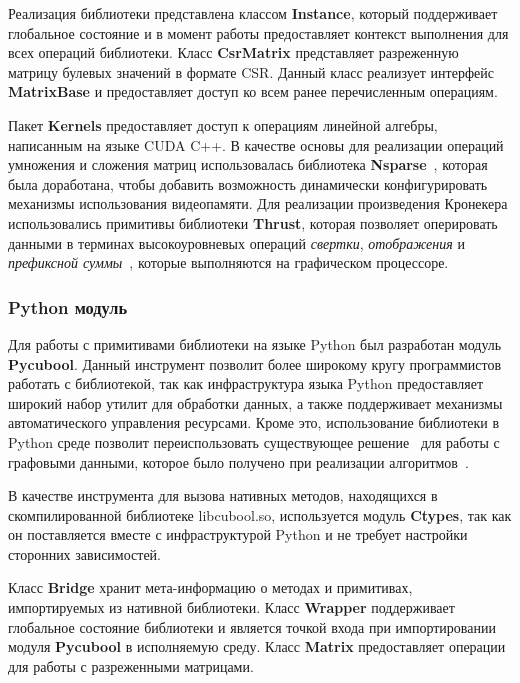 Реализация библиотеки представлена классом \textbf{Instance}, который поддерживает глобальное состояние и в момент работы предоставляет контекст выполнения для всех операций библиотеки. Класс \textbf{CsrMatrix} представляет разреженную матрицу булевых значений в формате CSR. Данный класс реализует интерфейс \textbf{MatrixBase} и предоставляет доступ ко всем ранее перечисленным операциям.

Пакет \textbf{Kernels} предоставляет доступ к операциям линейной алгебры, написанным на языке CUDA C++. В качестве основы для реализации операций умножения и сложения матриц использовалась библиотека \textbf{Nsparse}~\cite{inproceedings:cfqp_matrix_with_single_source}, которая была доработана, чтобы добавить возможность динамически конфигурировать механизмы использования видеопамяти. Для реализации произведения Кронекера использовались примитивы библиотеки \textbf{Thrust}, которая позволяет оперировать данными в терминах высокоуровневых операций \textit{свертки}, \textit{отображения} и \textit{префиксной суммы}~\cite{net:cuda_thrust}, которые выполняются на графическом процессоре.     

\subsubsection{Python модуль}

Для работы с примитивами библиотеки на языке Python был разработан модуль \textbf{Pycubool}. Данный инструмент позволит более широкому кругу программистов работать с библиотекой, так как инфраструктура языка Python предоставляет широкий набор утилит для обработки данных, а также поддерживает механизмы автоматического управления ресурсами. Кроме это, использование библиотеки в Python среде позволит переиспользовать существующее решение~\cite{net:cfpq_py_algo} для работы с графовыми данными, которое было получено при реализации алгоритмов~\cite{inbook:kronecker_cfpq_adbis, inproceedings:cfqp_matrix_with_single_source}.

В качестве инструмента для вызова нативных методов, находящихся в скомпилированной библиотеке libcubool.so, используется модуль \textbf{Ctypes}, так как он поставляется вместе с инфраструктурой Python и не требует настройки сторонних зависимостей. 

Класс \textbf{Bridge} хранит мета-информацию о методах и примитивах, импортируемых из нативной библиотеки. Класс \textbf{Wrapper} поддерживает глобальное состояние библиотеки и является точкой входа при импортировании модуля \textbf{Pycubool} в исполняемую среду. Класс \textbf{Matrix} предоставляет операции для работы с разреженными матрицами. 


